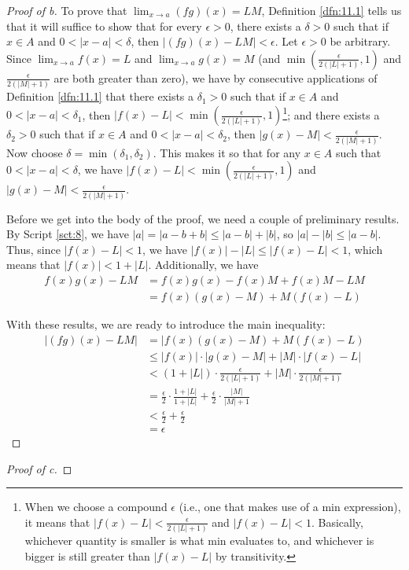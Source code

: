 \documentclass[../main.tex]{subfiles}
\begin{document}
\begin{theorem}
\begin{proof}[Proof of b]
        To prove that $\lim_{x\to a}(fg)(x)=LM$, Definition \ref{dfn:11.1} tells us that it will suffice to show that for every $\epsilon>0$, there exists a $\delta>0$ such that if $x\in A$ and $0<|x-a|<\delta$, then $|(fg)(x)-LM|<\epsilon$. Let $\epsilon>0$ be arbitrary. Since $\lim_{x\to a}f(x)=L$ and $\lim_{x\to a}g(x)=M$ (and $\min(\frac{\epsilon}{2(|L|+1)},1)$ and $\frac{\epsilon}{2(|M|+1)}$ are both greater than zero), we have by consecutive applications of Definition \ref{dfn:11.1} that there exists a $\delta_1>0$ such that if $x\in A$ and $0<|x-a|<\delta_1$, then $|f(x)-L|<\min(\frac{\epsilon}{2(|L|+1)},1)$\footnote{When we choose a compound $\epsilon$ (i.e., one that makes use of a min expression), it means that $|f(x)-L|<\frac{\epsilon}{2(|L|+1)}$ and $|f(x)-L|<1$. Basically, whichever quantity is smaller is what min evaluates to, and whichever is bigger is still greater than $|f(x)-L|$ by transitivity.}; and there exists a $\delta_2>0$ such that if $x\in A$ and $0<|x-a|<\delta_2$, then $|g(x)-M|<\frac{\epsilon}{2(|M|+1)}$. Now choose $\delta=\min(\delta_1,\delta_2)$. This makes it so that for any $x\in A$ such that $0<|x-a|<\delta$, we have $|f(x)-L|<\min(\frac{\epsilon}{2(|L|+1)},1)$ and $|g(x)-M|<\frac{\epsilon}{2(|M|+1)}$.\par
        Before we get into the body of the proof, we need a couple of preliminary results. By Script \ref{sct:8}, we have $|a|=|a-b+b|\leq|a-b|+|b|$, so $|a|-|b|\leq|a-b|$. Thus, since $|f(x)-L|<1$, we have $|f(x)|-|L|\leq|f(x)-L|<1$, which means that $|f(x)|<1+|L|$. Additionally, we have
        \begin{align*}
            f(x)g(x)-LM &= f(x)g(x)-f(x)M+f(x)M-LM\\
            &= f(x)(g(x)-M)+M(f(x)-L)
        \end{align*}\par
        With these results, we are ready to introduce the main inequality:
        \begin{align*}
            |(fg)(x)-LM| &= |f(x)(g(x)-M)+M(f(x)-L)\\
            &\leq |f(x)|\cdot|g(x)-M|+|M|\cdot|f(x)-L|\\
            &< (1+|L|)\cdot\frac{\epsilon}{2(|L|+1)}+|M|\cdot\frac{\epsilon}{2(|M|+1)}\\
            &= \frac{\epsilon}{2}\cdot\frac{1+|L|}{1+|L|}+\frac{\epsilon}{2}\cdot\frac{|M|}{|M|+1}\\
            &< \frac{\epsilon}{2}+\frac{\epsilon}{2}\\
            &= \epsilon
        \end{align*}
    \end{proof}
    \begin{proof}[Proof of c]


\end{proof}
\end{theorem}
\end{document}
